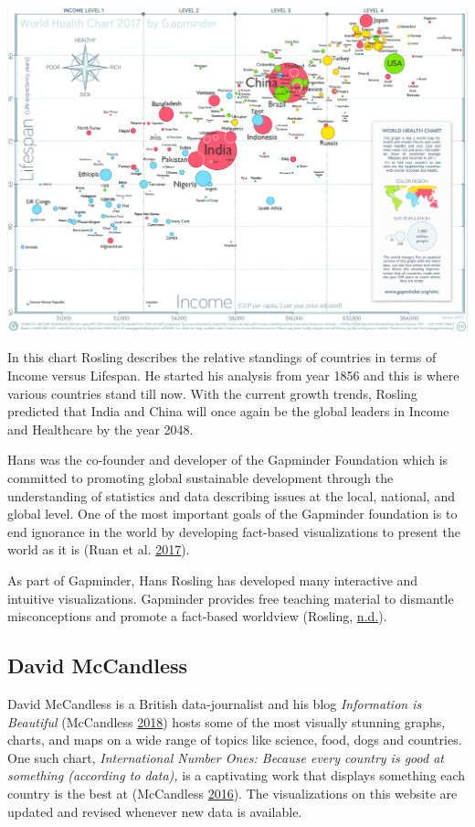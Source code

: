 \documentclass[]{book}
\begin{document}
\includegraphics{images/hans_world_health_chart.png}

In this chart Rosling describes the relative standings of countries in terms of Income versus Lifespan. He started his analysis from year 1856 and this is where various countries stand till now. With the current growth trends, Rosling predicted that India and China will once again be the global leaders in Income and Healthcare by the year 2048.

Hans was the co-founder and developer of the Gapminder Foundation which is committed to promoting global sustainable development through the understanding of statistics and data describing issues at the local, national, and global level. One of the most important goals of the Gapminder foundation is to end ignorance in the world by developing fact-based visualizations to present the world as it is (Ruan et al. \protect\hyperlink{ref-gapminder}{2017}).

As part of Gapminder, Hans Rosling has developed many interactive and intuitive visualizations. Gapminder provides free teaching material to dismantle misconceptions and promote a fact-based worldview (Rosling, \protect\hyperlink{ref-han_rosling_teaching}{n.d.}).

\hypertarget{david-mccandless}{%
\subsection{David McCandless}\label{david-mccandless}}

David McCandless is a British data-journalist and his blog \emph{Information is Beautiful} (McCandless \protect\hyperlink{ref-info_beautiful}{2018}) hosts some of the most visually stunning graphs, charts, and maps on a wide range of topics like science, food, dogs and countries. One such chart, \emph{International Number Ones: Because every country is good at something (according to data),} is a captivating work that displays something each country is the best at (McCandless \protect\hyperlink{ref-country_chart}{2016}). The visualizations on this website are updated and revised whenever new data is available.
\end{document}

